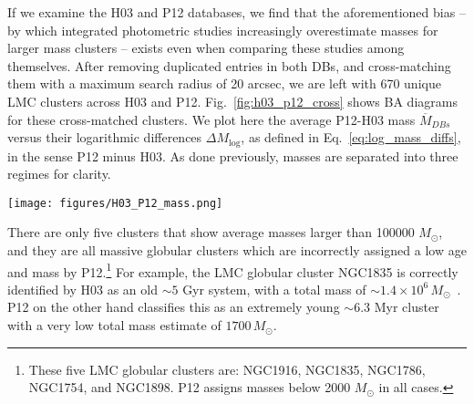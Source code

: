 \documentclass{aa}
\begin{document}
If we examine the H03 and P12 databases, we find that the aforementioned bias
-- by which integrated photometric studies increasingly overestimate masses for
larger mass clusters -- exists even when comparing these studies among
themselves.
%
After removing duplicated entries in both DBs, and cross-matching them with
a maximum search radius of 20 arcsec, we are left with 670 unique LMC clusters
across H03 and P12.
Fig.~\ref{fig:h03_p12_cross} shows BA diagrams for these cross-matched clusters.
We plot here the average P12-H03 mass $\overline{M}_{DBs}$
versus their logarithmic differences $\Delta M_{\log}$, as defined in
Eq.~\ref{eq:log_mass_diffs}, in the sense P12 minus H03. As done previously,
masses are separated into three regimes for clarity.
%
\begin{figure*}
\texttt{[image: figures/H03\_P12\_mass.png]}
\caption{\emph{Left}: BA plot for the logarithmic mass differences between P12
and H03 masses, for average mass values below 1000 $M_{\odot}$. Clusters are
colored according to the difference in their assigned logarithmic ages by each
DB -- i.e.: $\Delta \log(age/yr)$ -- in the sense P12 minus H03; see colorbar in
the right plot. The mean and standard deviation $\Delta M_{\log}$ are shown as a
dashed black line and a gray region, respectively.
\emph{Center}: idem, for average DB masses $1000<\overline{M}_{DB}<10000\,(M_
{\odot})$.
\emph{Right}: idem, for average DB masses $\overline{M}_{DB}>10000\,(M_
{\odot})$.}
\label{fig:h03_p12_cross}
\end{figure*}
%
There are only five clusters that show average masses larger than 100000
$M_{\odot}$, and they are all massive globular clusters which are incorrectly
assigned a low age and mass by P12.\footnote{These five LMC globular clusters
are: NGC1916, NGC1835, NGC1786, NGC1754, and NGC1898. P12 assigns masses
below 2000 $M_{\odot}$ in all cases.}
For example, the LMC globular cluster NGC1835 is correctly identified by H03 as
an old ${\sim}5$ Gyr system, with a total mass of
$\sim1.4{\times}10^6\,M_{\odot}$~\citep[a reasonable value, although a bit
overestimated, according to][]{Dubath_1990}. P12 on the other hand classifies
this as an extremely young ${\sim}6.3$ Myr cluster with a very low total mass
estimate of $1700\,M_{\odot}$.
\end{document}
